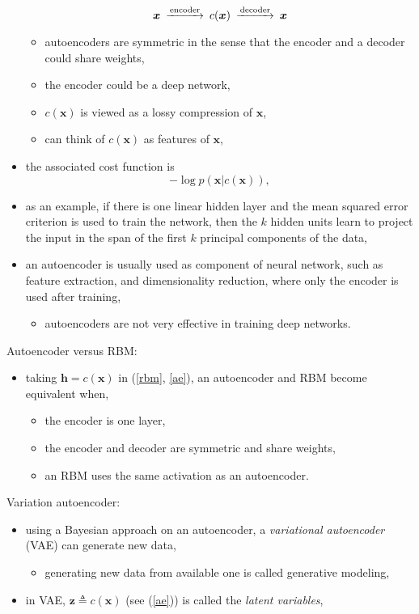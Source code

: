 \documentclass[onecolumn]{IEEEtran}
\newcommand{\beq}{\begin{equation}}
\newcommand{\eeq}{\end{equation}}
\newcommand{\bi}{\begin{itemize}}
\newcommand{\ei}{\end{itemize}}
\begin{document}
\begin{itemize}
        \beq\label{ae}\begin{CD}
            \bm{x} @>\text{encoder}>> c(\bm{x}) @>\text{decoder}>> \bm{x}
        \end{CD}\eeq
        \bi
            \item autoencoders are symmetric in the sense that the encoder and a decoder could share weights,
            \item the encoder could be a deep network,
            \item $c(\bm{x})$ is viewed as a lossy compression of $\bm{x}$,
            \item can think of $c(\bm{x})$ as features of $\bm{x}$,
        \ei
        \item the associated cost function is
        \beq
            - \log p(\bm{x}|c(\bm{x})),
        \eeq
        \item as an example, if there is one linear hidden layer and the mean squared error criterion is used to train the network, then the $k$ hidden units learn to project the input in the span of the first $k$ principal components of the data,
        \item an autoencoder is usually used as component of neural network, such as feature extraction, and dimensionality reduction, where only the encoder is used after training,
        \bi
            \item autoencoders are not very effective in training deep networks.
        \ei
    \ei
    \item Autoencoder versus RBM:
    \bi
        \item taking $\bm{h} = c(\bm{x})$ in (\ref{rbm}, \ref{ae}), an autoencoder and RBM become equivalent when,
        \bi
            \item the encoder is one layer,
            \item the encoder and decoder are symmetric and share weights,
            \item an RBM uses the same activation as an autoencoder.
        \ei
    \ei
    \item Variation autoencoder:
    \bi
        \item using a Bayesian approach on an autoencoder, a \emph{variational autoencoder} (VAE) can generate new data,
        \bi
            \item generating new data from available one is called generative modeling,
        \ei
        \item in VAE, $\bm{z} \triangleq c(\bm{x})$ (see (\ref{ae})) is called the \emph{latent variables},

\end{itemize}
\end{document}
